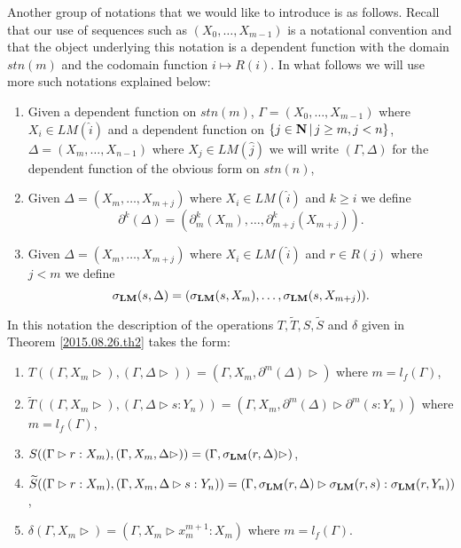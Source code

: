 \documentclass[11pt]{article}
\newcommand{\nn}{{\bf N\rm}}
\newcommand{\nat}{\nn}
\newcommand{\lm}{{\bf LM}}
\newcommand{\wt}{\widetilde}
\newcommand{\wh}{\widehat}
\begin{document}
Another group of notations that we would like to introduce is as follows. Recall that our use of sequences such as $(X_0,\dots,X_{m-1})$ is a notational convention and that the object underlying this notation is a dependent function with the domain $stn(m)$ and the codomain function $i\mapsto R(i)$. In what follows we will use more such notations explained below:
%
\begin{enumerate}
\item Given a dependent function on $stn(m)$, $\Gamma=(X_0,\dots,X_{m-1})$ where $X_i\in LM(\wh{i})$ and a dependent function on $\{j\in\nat\,|\, j\ge m, j<n\}$, $\Delta=(X_m,\dots,X_{n-1})$ where $X_j\in LM(\wh{j})$ we will write $(\Gamma,\Delta)$ for the dependent function of the obvious form on $stn(n)$,
%
\item Given $\Delta=(X_m,\dots,X_{m+j})$ where $X_i\in LM(\wh{i})$ and $k\ge i$ we define 
%
$$\partial^k(\Delta)=(\partial^k_m(X_m),\dots,\partial^k_{m+j}(X_{m+j})).$$  
%
\item Given $\Delta=(X_m,\dots,X_{m+j})$ where $X_i\in LM(\wh{i})$ and $r\in R(j)$ where $j<m$ we define
%
$$\sigma_{\lm}(s,\Delta)=(\sigma_{\lm}(s,X_m),\dots,\sigma_{\lm}(s,X_{m+j})).$$
%
\end{enumerate}
%
In this notation the description of the operations $T,\wt{T},S,\wt{S}$ and $\delta$  given in Theorem \ref{2015.08.26.th2} takes the form:
%
\begin{enumerate}
\item $T((\Gamma,X_m\rhd),(\Gamma,\Delta\rhd))=(\Gamma,X_m,\partial^m(\Delta)\rhd)$ where $m=l_f(\Gamma)$,
\item $\wt{T}((\Gamma,X_m\rhd),(\Gamma,\Delta\rhd s:Y_n))=(\Gamma,X_m,\partial^m(\Delta)\rhd \partial^m(s:Y_n))$ where $m=l_f(\Gamma)$,
\item $S((\Gamma\rhd r:X_m),(\Gamma,X_m,\Delta\rhd))=(\Gamma,\sigma_{\lm}(r,\Delta)\rhd)$,
\item $\wt{S}((\Gamma\rhd r:X_m),(\Gamma,X_m,\Delta\rhd s:Y_n))=(\Gamma,\sigma_{\lm}(r,\Delta)\rhd \sigma_{\lm}(r,s):\sigma_{\lm}(r,Y_n))$,
\item $\delta(\Gamma,X_m\rhd)=(\Gamma,X_m\rhd x^{m+1}_m:X_m)$ where $m=l_f(\Gamma)$.
\end{enumerate}
%
\end{document}

